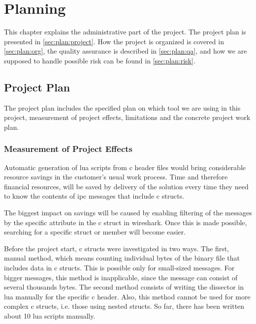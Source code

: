 \chapter{Planning}
This chapter explains the administrative part of the project. The project plan 
is presented in \autoref{sec:plan:project}. How the project is organized is 
covered in \autoref{sec:plan:org}, the quality assurance is described in 
\autoref{sec:plan:qa}, and how we are supposed to handle possible risk can be 
found in \autoref{sec:plan:risk}.

\section{Project Plan}
\label{sec:plan:project}
The project plan includes the specified plan on which tool we are using in this project, measurement of project effects, limitations and the concrete project work plan.

\subsection{Measurement of Project Effects}
Automatic generation of \Gls{lua} \glspl{script} from \Gls{c} \gls{header} files would bring considerable resource savings in the customer's usual work process. Time and therefore financial resources, will be saved by delivery of the solution every time they need to know the contents of \gls{ipc} messages that include \Gls{c} \glspl{struct}.

The biggest impact on savings will be caused by enabling filtering of the messages by the specific attribute in the \Gls{c} \gls{struct} in \Gls{wireshark}. Once this is made possible, searching for a specific \gls{struct} or \gls{member} will become easier.

Before the project start, \Gls{c} \glspl{struct} were investigated in two ways. The first, manual method, which means counting individual bytes of the \gls{binary} file that includes data in \Gls{c} \glspl{struct}. This is possible only for small-sized messages. For bigger messages, this method is inapplicable, since the message can consist of several thousands bytes. The second method consists of writing the \gls{dissector} in \Gls{lua} manually for the specific \Gls{c} \gls{header}. Also, this method cannot be used for more complex \Gls{c} \glspl{struct}, i.e. those using \glspl{nested struct}. So far, there has been written about 10 \Gls{lua} \glspl{script} manually.

